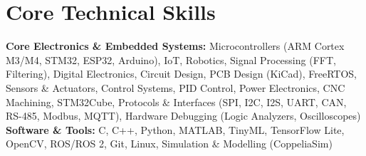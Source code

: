 \documentclass[10pt,a4paper]{article}%
\begin{document}
\section*{Core Technical Skills}%
\noindent \textbf{Core Electronics \& Embedded Systems:} Microcontrollers (ARM Cortex M3/M4, STM32, ESP32, Arduino), IoT, Robotics, Signal Processing (FFT, Filtering), Digital Electronics, Circuit Design, PCB Design (KiCad), FreeRTOS, Sensors \& Actuators, Control Systems, PID Control, Power Electronics, CNC Machining, STM32Cube, Protocols \& Interfaces (SPI, I2C, I2S, UART, CAN, RS-485, Modbus, MQTT), Hardware Debugging (Logic Analyzers, Oscilloscopes) \vspace{6pt}\\%
\noindent \textbf{Software \& Tools:} C, C++, Python, MATLAB, TinyML, TensorFlow Lite, OpenCV, ROS/ROS 2, Git, Linux, Simulation \& Modelling (CoppeliaSim)%
\end{document}
